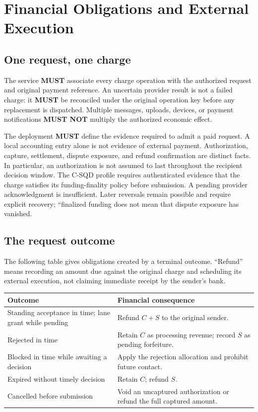 \documentclass[11pt]{article}
\newcommand{\MUST}{\textbf{MUST}}
\newcommand{\MUSTNOT}{\textbf{MUST NOT}}
\begin{document}
\section{Financial Obligations and External Execution}

\subsection{One request, one charge}

The service \MUST{} associate every charge operation with the authorized request
and original payment reference. An uncertain provider result is not a failed
charge: it \MUST{} be reconciled under the original operation key before any
replacement is dispatched. Multiple messages, uploads, devices, or payment
notifications \MUSTNOT{} multiply the authorized economic effect.

The deployment \MUST{} define the evidence required to admit a paid request.
A local accounting entry alone is not evidence of external payment. Authorization,
capture, settlement, dispute exposure, and refund confirmation are distinct
facts. In particular, an authorization is not assumed to last throughout the
recipient decision window. The C-SQD profile requires authenticated evidence that the charge satisfies its
funding-finality policy before submission. A pending provider acknowledgment is
insufficient. Later reversals remain possible and require explicit recovery;
``finalized funding does not mean that dispute exposure has vanished.

\subsection{The request outcome}

The following table gives obligations created by a terminal outcome. ``Refund''
means recording an amount due against the original charge and scheduling its
external execution, not claiming immediate receipt by the sender's bank.

\begin{center}
\small
\begin{tabularx}{\textwidth}{@{}>{\raggedright\arraybackslash}p{}Y@{}}
\toprule
Outcome & Financial consequence \\
\midrule
Standing acceptance in time; lane grant while pending & Refund $C+S$ to the original sender. \\
Rejected in time & Retain $C$ as processing revenue; record $S$ as pending forfeiture. \\
Blocked in time while awaiting a decision & Apply the rejection allocation and prohibit future contact. \\
Expired without timely decision & Retain $C$; refund $S$. \\
Cancelled before submission & Void an uncaptured authorization or refund the full captured amount. \\
\bottomrule
\end{tabularx}
\end{center}
\end{document}
